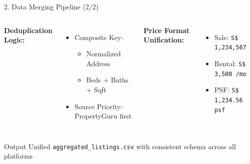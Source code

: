 \documentclass[aspectratio=169,10pt]{beamer}
\begin{document}
\begin{frame}{2. Data Merging Pipeline (2/2)}
    \begin{columns}[T]
        \textbf{Deduplication Logic:}
        \begin{itemize}
            \item Composite Key:
            \begin{itemize}
                \item Normalized Address
                \item Beds + Baths + Sqft
            \end{itemize}
            \item Source Priority: PropertyGuru first
        \end{itemize}
        
        \textbf{Price Format Unification:}
        \begin{itemize}
            \item Sale: \texttt{S\$ 1,234,567}
            \item Rental: \texttt{S\$ 3,500 /mo}
            \item PSF: \texttt{S\$ 1,234.56 psf}
        \end{itemize}
    \end{columns}
    
    \vspace{0.5cm}
    
    \begin{block}{Output}
        Unified \texttt{aggregated\_listings.csv} with consistent schema across all platforms
    \end{block}
\end{frame}
\end{document}
